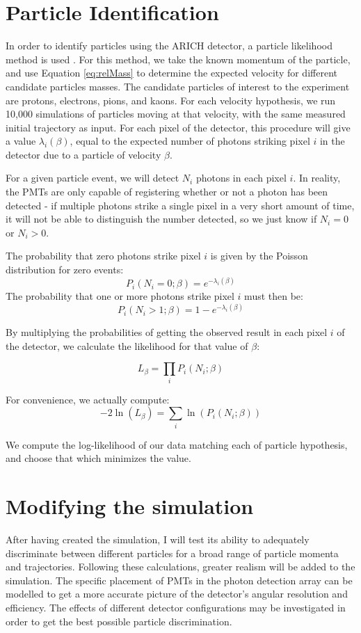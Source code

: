 \section{Particle Identification}
\label{sec:particleIdentification}
In order to identify particles using the \ac{ARICH} detector, a particle likelihood method is used \cite{richImpact, belleArich}.
For this method, we take the known momentum of the particle, and use Equation \ref{eq:relMass} to determine the expected velocity for different candidate particles masses.
The candidate particles of interest to the experiment are protons, electrons, pions, and kaons.
For each velocity hypothesis, we run 10,000 simulations of particles moving at that velocity, with the same measured initial trajectory as input.
For each pixel of the detector, this procedure will give a value $\lambda_i(\beta)$, equal to the expected number of photons striking pixel $i$ in the detector due to a particle of velocity $\beta$. 

For a given particle event, we will detect $N_i$ photons in each pixel $i$.
In reality, the PMTs are only capable of registering whether or not a photon has been detected - if multiple photons strike a single pixel in a very short amount of time, it will not be able to distinguish the number detected, so we just know if $N_i = 0$ or $N_i > 0$.

The probability that zero photons strike pixel $i$ is given by the Poisson distribution for zero events:
$$ P_i(N_i=0; \beta) = e^{-\lambda_i(\beta)} $$
 The probability that one or more photons strike pixel $i$ must then be:
$$ P_i(N_i>1; \beta) = 1 - e^{-\lambda_i(\beta)} $$

By multiplying the probabilities of getting the observed result in each pixel $i$ of the detector, we calculate the likelihood for that value of $\beta$:

$$L_\beta = \prod_{i}P_i(N_i; \beta)$$

For convenience, we actually compute:
\begin{equation}
    \label{eq:loglikelihood}
    -2\ln(L_\beta) = \sum_i \ln(P_i(N_i; \beta))
\end{equation}


We compute the log-likelihood of our data matching each of particle hypothesis, and choose that which minimizes the value.

\section{Modifying the simulation}
After having created the simulation, I will test its ability to adequately discriminate between different particles for a broad range of particle momenta and trajectories. Following these calculations, greater realism will be added to the simulation.
The specific placement of PMTs in the photon detection array can be modelled to get a more accurate picture of the detector's angular resolution and efficiency.
The effects of different detector configurations may be investigated in order to get the best possible particle discrimination. 

